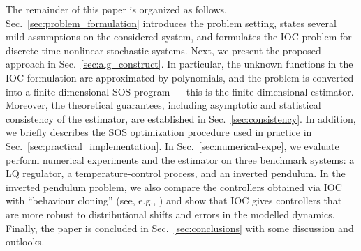 The remainder of this paper is organized as follows.
Sec.~\ref{sec:problem_formulation} introduces the problem setting, states several mild assumptions on the considered system, and formulates the IOC problem for discrete-time nonlinear stochastic systems.
Next, we present the proposed approach in Sec.~\ref{sec:alg_construct}. In particular, the unknown functions in the IOC formulation are approximated by polynomials, and the problem is converted into a finite-dimensional SOS program --- this is the finite-dimensional estimator.
Moreover, the theoretical guarantees, including asymptotic and statistical consistency of the estimator, are established in Sec.~\ref{sec:consistency}.
In addition, we briefly describes the SOS optimization procedure used in practice in Sec.~\ref{sec:practical_implementation}. 
In Sec.~\ref{sec:numerical-expe}, we evaluate perform  numerical experiments and the estimator on three benchmark systems: a LQ regulator, a temperature-control process, and an inverted pendulum. In the inverted pendulum problem, we also compare the controllers obtained via IOC with ``behaviour cloning'' (see, e.g., \citep{sammut2017behavioral, codevilla2019exploring, torabi2018behavioralcloningobservation}) and show that IOC gives controllers that are more robust to distributional shifts and errors in the modelled dynamics.
Finally, the paper is concluded in Sec.~\ref{sec:conclusions} with some discussion and outlooks.

